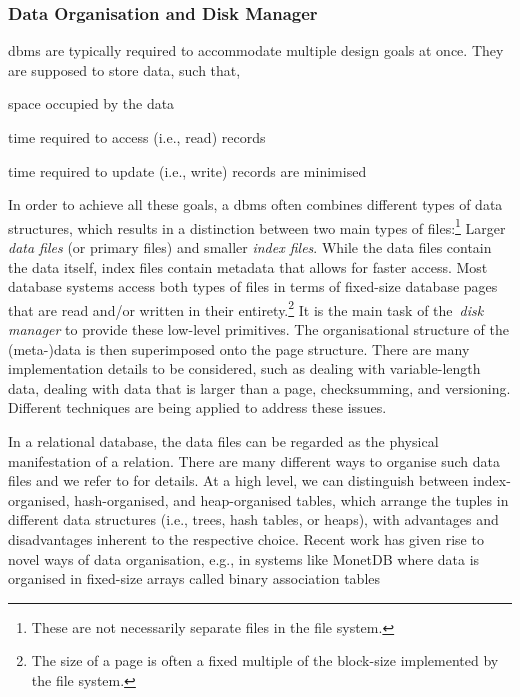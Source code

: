 \subsubsection{Data Organisation and Disk Manager}
\acrshort{dbms} are typically required to accommodate multiple design goals at once. They are supposed to store data, such that,
\begin{enumerate*}[label=(\roman*),itemjoin={{, }}, itemjoin*={{, and, }}, after={{.}}]
    \item space occupied by the data
    \item time required to access (i.e., read) records
    \item time required to update (i.e., write) records are minimised
\end{enumerate*}
In order to achieve all these goals, a \acrshort{dbms} often combines different types of data structures, which results in a distinction between two main types of files:\footnote{These are not necessarily separate files in the file system.} Larger \emph{data files} (or primary files) and smaller \emph{index files}. While the data files contain the data itself, index files contain metadata that allows for faster access. Most database systems access both types of files in terms of fixed-size database pages that are read and/or written in their entirety.\footnote{The size of a page is often a fixed multiple of the block-size implemented by the file system.} It is the main task of the \emph{disk manager} to provide these low-level primitives. The organisational structure of the (meta-)data is then superimposed onto the page structure. There are many implementation details to be considered, such as dealing with variable-length data, dealing with data that is larger than a page, checksumming, and versioning. Different techniques are being applied to address these issues.

In a relational database, the data files can be regarded as the physical manifestation of a relation. There are many different ways to organise such data files and we refer to \cite{Petrov:2019Database} for details. At a high level, we can distinguish between index-organised, hash-organised, and heap-organised tables, which arrange the tuples in different data structures (i.e., trees, hash tables, or heaps), with advantages and disadvantages inherent to the respective choice. Recent work has given rise to novel ways of data organisation, e.g., in systems like MonetDB where data is organised in fixed-size arrays called binary association tables \cite{Boncz:2008Breaking}

